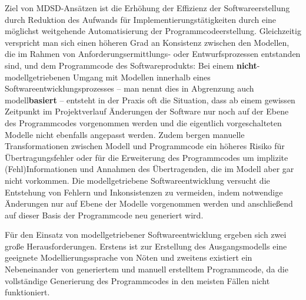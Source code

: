 Ziel von MDSD-Ansätzen ist die Erhöhung der Effizienz der Softwareerstellung durch Reduktion des Aufwands für Implementierungstätigkeiten durch eine möglichst weitgehende Automatisierung der Programmcodeerstellung. Gleichzeitig verspricht man sich einen höheren Grad an Konsistenz zwischen den Modellen, die im Rahmen von An\-for\-de\-rungs\-er\-mitt\-lungs- oder Entwurfsprozessen entstanden sind, und dem Programmcode des Softwareprodukts: Bei einem \textbf{nicht}-modellgetriebenen Umgang mit Modellen innerhalb eines Softwareentwicklungsprozesses – man nennt dies in Abgrenzung auch modell\textbf{basiert} – entsteht in der Praxis oft die Situation, dass ab einem gewissen Zeitpunkt im Projektverlauf Änderungen der Software nur noch auf der Ebene des Programmcodes vorgenommen werden und die eigentlich vorgeschalteten Modelle nicht ebenfalls angepasst werden. Zudem bergen manuelle Transformationen zwischen Modell und Programmcode ein höheres Risiko für Übertragungsfehler oder für die Erweiterung des Programmcodes um implizite (Fehl)Informationen und Annahmen des Übertragenden, die im Modell aber gar nicht vorkommen. Die modellgetriebene Softwareentwicklung versucht die Entstehung von Fehlern und Inkonsistenzen zu vermeiden, indem notwendige Änderungen nur auf Ebene der Modelle vorgenommen werden und anschließend auf dieser Basis der Programmcode neu generiert wird.

Für den Einsatz von modellgetriebener Softwareentwicklung ergeben sich zwei große Herausforderungen. Erstens ist zur Erstellung des Ausgangsmodells eine geeignete Modellierungssprache von Nöten und zweitens existiert ein Nebeneinander von generiertem und manuell erstelltem Programmcode, da die vollständige Generierung des Programmcodes in den meisten Fällen nicht funktioniert. 

